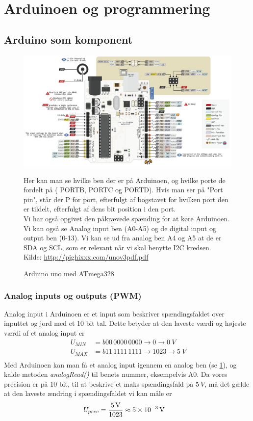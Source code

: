\section{Arduinoen og programmering} \label{sec:arduino}
\subsection{Arduino som komponent}
\begin{figure}[H]
	\centering
    \includegraphics[width=\textwidth]{figures/arduino/portmani.PNG}
	\caption{Arduino uno med ATmega328}
	\label{fig:portmani}
	Her kan man se hvilke ben der er på Arduinoen, og hvilke porte de fordelt på ( PORTB, PORTC og PORTD). Hvis man ser på "Port pin", står der P for port, efterfulgt af bogstavet for hvilken port den er tildelt, efterfulgt af dens bit position i den port.\\
	Vi har også opgivet den påkrævede spænding for at køre Arduinoen. Vi kan også se Analog input ben (A0-A5) og de digital input og output ben (0-13). Vi kan se ud fra analog ben A4 og A5 at de er SDA og SCL, som er relevant når vi skal benytte I2C kredsen.
	\\Kilde: \url{http://pighixxx.com/unov3pdf.pdf}
\end{figure}
\subsubsection{Analog inputs og outputs (PWM)}\label{sec:ard:analog}
Analog input i Arduinoen er et input som beskriver spændingsfaldet over inputtet og jord med et 10 bit tal.\cite{arduinoAnalog} Dette betyder at den laveste værdi og højeste værdi af et analog input er
\begin{align}
\SI{}{U_{MIN}}&=b00\,0000\,0000\rightarrow 0\rightarrow \SI{0}{V}\\
\SI{}{U_{MAX}}&=b11\,1111\,1111\rightarrow 1023\rightarrow \SI{5}{V}\\
\end{align}
Med Arduinoen kan man få et analog input igennem en analog ben (se \ref{fig:portmani}), og kalde metoden \emph{analogRead()} til benets nummer, eksempelvis A0. Da vores precision er på 10 bit, til at beskrive et maks spændingsfald på $\SI{5}{V}$, må det gælde at den laveste ændring i spændingsfaldet vi kan måle er
\begin{align}
U_{prec}&=\frac{\SI{5}{V}}{1023}\approx \SI{5d-3}{V}
\end{align}
